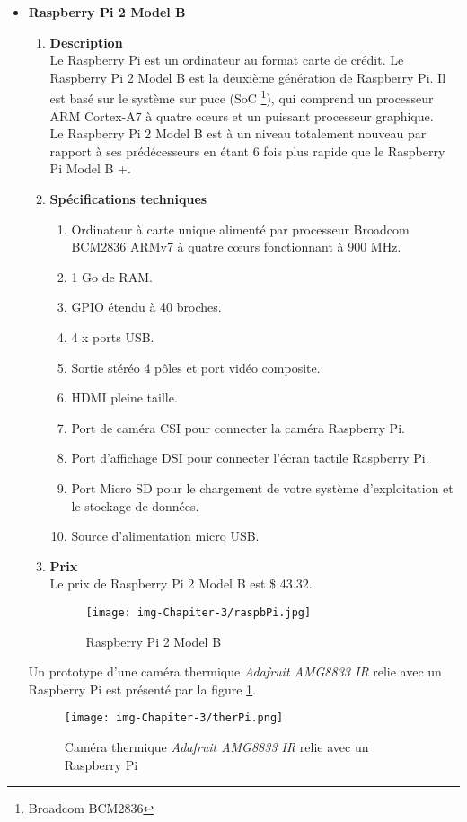 \documentclass[12pt]{article}
\begin{document}
\begin{itemize}
	\item \textbf{Raspberry Pi 2 Model B \cite{46}}
	\begin{enumerate}
		\item \textbf{Description}\\
	Le Raspberry Pi est un ordinateur au format carte de crédit. Le Raspberry Pi 2 Model B est la deuxième génération de Raspberry Pi. Il est basé sur le système sur puce (SoC \footnote{Broadcom BCM2836}), qui comprend un processeur ARM Cortex-A7 à quatre cœurs et un puissant processeur graphique.\\
		
		Le Raspberry Pi 2 Model B est à un niveau totalement nouveau par rapport à ses prédécesseurs en étant 6 fois plus rapide que le Raspberry Pi Model B +.
	\item \textbf{Spécifications techniques}\\
		\begin{enumerate}
			\item Ordinateur à carte unique alimenté par processeur Broadcom BCM2836 ARMv7 à quatre cœurs fonctionnant à 900 MHz.
			\item 1 Go de RAM.
			\item GPIO étendu à 40 broches.
			\item 4 x ports USB.
			\item Sortie stéréo 4 pôles et port vidéo composite.
			\item HDMI pleine taille.
			\item Port de caméra CSI pour connecter la caméra Raspberry Pi.
			\item Port d’affichage DSI pour connecter l’écran tactile Raspberry Pi.
			\item Port Micro SD pour le chargement de votre système d'exploitation et le stockage de données.
			\item Source d'alimentation micro USB.
\end{enumerate}
	\item \textbf{Prix} \\
	
	Le prix de Raspberry Pi 2 Model B est \$ 43.32. \\
	
	\newpage
	\begin{figure}[h]
		\centering
		\texttt{[image: img-Chapiter-3/raspbPi.jpg]}
		\caption{Raspberry Pi 2 Model B}
	\end{figure}
	
	\end{enumerate}	
	Un prototype d'une caméra thermique \textit{Adafruit AMG8833 IR} relie avec un Raspberry Pi est présenté par la figure \ref{fig:raspther}.
	
	\begin{figure}[h]
		\centering
		\texttt{[image: img-Chapiter-3/therPi.png]}
		\caption{Caméra thermique \textit{Adafruit AMG8833 IR} relie avec un Raspberry Pi }
		\label{fig:raspther}
	\end{figure}
\end{itemize}
\end{document}
